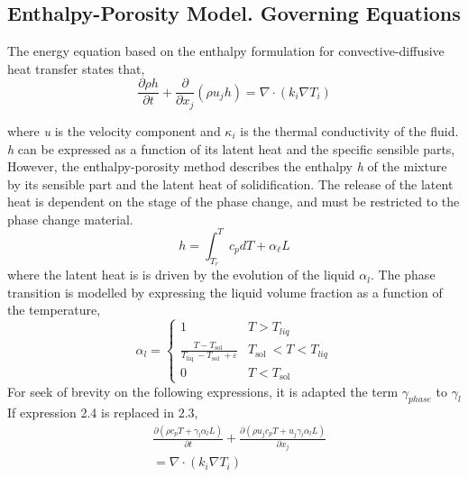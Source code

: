 \subsection{Enthalpy-Porosity Model. Governing Equations}
The energy equation based on the enthalpy formulation for convective-diffusive heat transfer states that,
\begin{equation}
	\frac{\partial \rho h}{\partial t}+\frac{\partial}{\partial x_{j}}\left(\rho u_{j} h\right)=\nabla \cdot\left(k_{i} \nabla T_{i}\right)
	\label{2.4}
\end{equation}

where \textit{u} is the velocity component and $\kappa_{i}$ is the thermal conductivity of the fluid. \textit{h} can be expressed as a function of its latent heat and the specific sensible parts,
\newline
However, the enthalpy-porosity method describes the enthalpy \textit{h} of the mixture by its sensible part and the latent heat of solidification.
The release of the latent heat is dependent on the stage of the phase change, and must be restricted to the phase change material.
\begin{equation}
	h=\int_{T_{r}}^{T} c_{p} d T+\alpha_{\ell} L
	\label{2.5}
\end{equation}
where the latent heat is is driven by the evolution of the liquid $\alpha_{l}$. The phase transition is modelled by expressing the liquid volume fraction as a function of the temperature,
\begin{equation}
	\alpha_{l}= \begin{cases}
		1 & T>T_{l i q} \\ \frac{T-T_{\text {sol }}}{T_{\text {liq }}-T_{\text {sol }}+\varepsilon} & T_{\text {sol }}<T<T_{l i q} \\ 0 & T<T_{\text {sol }}
	\end{cases}
	\label{2.6}
\end{equation}
For seek of brevity on the following expressions, it is adapted the term $\gamma_{phase}$ to $\gamma_{l}$ 
If expression 2.4 is replaced in 2.3,
\begin{equation}
	\begin{aligned}
		&\frac{\partial\left(\rho c_{p} T + \gamma_{l} \alpha_{l} L\right)}{\partial t}+\frac{\partial\left(\rho u_{j} c_{p} T + u_{j}\gamma_{l} \alpha_{l} L\right)}{\partial x_{j}} \\
		&=\nabla \cdot\left(k_{i} \nabla T_{i}\right)
	\end{aligned}
	\label{2.7}
\end{equation}
